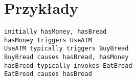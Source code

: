 \section{Przykłady}
\begin{example}
	\begin{lstlisting}
initially hasMoney, hasBread
hasMoney triggers UseATM
UseATM typically triggers BuyBread
BuyBread causes hasBread, hasMoney
hasBread typically invokes EatBread
EatBread causes hasBread
	\end{lstlisting}
\end{example}

